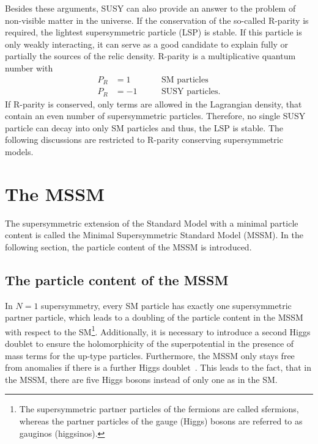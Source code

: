 Besides these arguments, SUSY can also provide an answer to the problem of non-visible matter in the universe.
If the conservation of the so-called R-parity is required, the lightest supersymmetric particle (LSP) is stable.
If this particle is only weakly interacting, it can serve as a good candidate to explain fully or partially the sources of the relic density. 
R-parity is a multiplicative quantum number with 
\begin{equation}
\begin{aligned}
P_R & =  1 \qquad &&\text{SM particles}\\
P_R & = -1 &&\text{SUSY particles}.
\end{aligned}
\end{equation}
If R-parity is conserved, only terms are allowed in the Lagrangian density, that contain an even number of supersymmetric particles.
Therefore, no single SUSY particle can decay into only SM particles and thus, the LSP is stable.
The following discussions are restricted to R-parity conserving supersymmetric models.



\section{The MSSM}
\label{sec:MSSM}
The supersymmetric extension of the Standard Model with a minimal particle content is called the Minimal Supersymmetric Standard Model (MSSM).
In the following section, the particle content of the MSSM is introduced.

\subsection{The particle content of the MSSM}
In $N=1$ supersymmetry, every SM particle has exactly one supersymmetric partner particle, which leads to a doubling of the particle content in the MSSM with respect to the SM\footnote{The supersymmetric partner particles of the fermions are called sfermions, whereas the partner particles of the gauge (Higgs) bosons are referred to as gauginos (higgsinos).}.
Additionally, it is necessary to introduce a second Higgs doublet to ensure the holomorphicity of the superpotential in the presence of mass terms for the up-type particles.
Furthermore, the MSSM only stays free from anomalies if there is a further Higgs doublet~\cite{bib:SUSYPrimer}.
This leads to the fact, that in the MSSM, there are five Higgs bosons instead of only one as in the SM.

